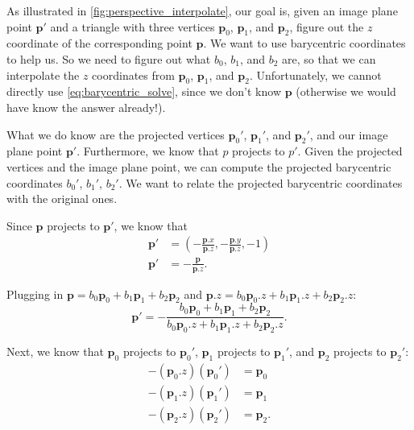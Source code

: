 As illustrated in \cref{fig:perspective_interpolate}, our goal is, given an image plane point $\mathbf{p}'$ and a triangle with three vertices $\mathbf{p}_0$, $\mathbf{p}_1$, and $\mathbf{p}_2$, figure out the $z$ coordinate of the corresponding point $\mathbf{p}$. We want to use barycentric coordinates to help us. So we need to figure out what $b_0$, $b_1$, and $b_2$ are, so that we can interpolate the $z$ coordinates from $\mathbf{p}_0$, $\mathbf{p}_1$, and $\mathbf{p}_2$. Unfortunately, we cannot directly use \cref{eq:barycentric_solve}, since we don't know $\mathbf{p}$ (otherwise we would have know the answer already!). 

What we do know are the projected vertices $\mathbf{p}_0'$, $\mathbf{p}_1'$, and $\mathbf{p}_2'$, and our image plane point $\mathbf{p}'$. Furthermore, we know that $p$ projects to $p'$. Given the projected vertices and the image plane point, we can compute the projected barycentric coordinates $b_0'$, $b_1'$, $b_2'$. We want to relate the projected barycentric coordinates with the original ones.

Since $\mathbf{p}$ projects to $\mathbf{p}'$, we know that
\begin{equation}
\begin{aligned}
\mathbf{p}' &= \left(-\frac{\mathbf{p}.x}{\mathbf{p}.z}, -\frac{\mathbf{p}.y}{\mathbf{p}.z}, -1\right) \\
\mathbf{p}' &= -\frac{\mathbf{p}}{\mathbf{p}.z}.
\end{aligned}
\end{equation}

Plugging in $\mathbf{p} = b_0 \mathbf{p}_0 + b_1 \mathbf{p}_1 + b_2 \mathbf{p}_2$ and $\mathbf{p}.z = b_0 \mathbf{p}_0.z + b_1 \mathbf{p}_1.z + b_2 \mathbf{p}_2.z$:
\begin{equation}
\mathbf{p}' = -\frac{b_0 \mathbf{p}_0 + b_1 \mathbf{p}_1 + b_2 \mathbf{p}_2}{b_0 \mathbf{p}_0.z + b_1 \mathbf{p}_1.z + b_2 \mathbf{p}_2.z}.
\end{equation}

Next, we know that $\mathbf{p}_0$ projects to $\mathbf{p}_0'$, $\mathbf{p}_1$ projects to $\mathbf{p}_1'$, and $\mathbf{p}_2$ projects to $\mathbf{p}_2'$:
\begin{equation}
\begin{aligned}
-\left(\mathbf{p}_0.z\right) \left(\mathbf{p}_0'\right) &= \mathbf{p}_0 \\
-\left(\mathbf{p}_1.z\right) \left(\mathbf{p}_1'\right) &= \mathbf{p}_1 \\
-\left(\mathbf{p}_2.z\right) \left(\mathbf{p}_2'\right) &= \mathbf{p}_2.
\end{aligned}
\end{equation}

